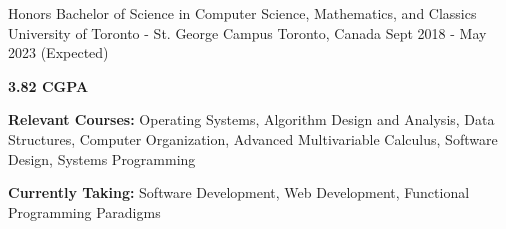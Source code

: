 

\begin{cventries}
  \cventry
  {Honors Bachelor of Science in Computer Science, Mathematics, and Classics} %
  {University of Toronto - St. George Campus} %
  {Toronto, Canada} %
  {Sept 2018 - May 2023 (Expected)} %
  {
    \begin{cvitems} %
      \item {\textbf{3.82 CGPA}}
      \item {\textbf{Relevant Courses:} Operating Systems, Algorithm Design and Analysis, Data Structures, Computer Organization, Advanced Multivariable Calculus, Software Design, Systems Programming}
      \item {\textbf{Currently Taking:} Software Development, Web Development, Functional Programming Paradigms}
    \end{cvitems}
  }

\end{cventries}
